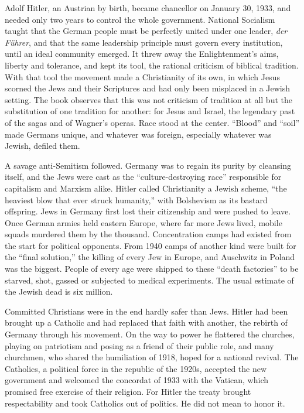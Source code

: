 Adolf Hitler, an Austrian by birth, became chancellor on January 30, 1933, and needed only two years
to control the whole government. National Socialism taught that the German people must be perfectly
united under one leader, \emph{der F\"uhrer}, and that the same leadership principle must govern
every institution, until an ideal community emerged. It threw away the Enlightenment's aims, liberty
and tolerance, and kept its tool, the rational criticism of biblical tradition. With that tool the
movement made a Christianity of its own, in which Jesus scorned the Jews and their Scriptures and had
only been misplaced in a Jewish setting. The book observes that this was not criticism of tradition
at all but the substitution of one tradition for another: for Jesus and Israel, the legendary past of
the sagas and of Wagner's operas. Race stood at the center. ``Blood'' and ``soil'' made Germans
unique, and whatever was foreign, especially whatever was Jewish, defiled them.

A savage anti-Semitism followed. Germany was to regain its purity by cleansing itself, and the Jews
were cast as the ``culture-destroying race'' responsible for capitalism and Marxism alike. Hitler
called Christianity a Jewish scheme, ``the heaviest blow that ever struck humanity,'' with Bolshevism
as its bastard offspring. Jews in Germany first lost their citizenship and were pushed to leave. Once
German armies held eastern Europe, where far more Jews lived, mobile squads murdered them by the
thousand. Concentration camps had existed from the start for political opponents. From 1940 camps of
another kind were built for the ``final solution,'' the killing of every Jew in Europe, and Auschwitz
in Poland was the biggest. People of every age were shipped to these ``death factories'' to be
starved, shot, gassed or subjected to medical experiments. The usual estimate of the Jewish dead is
six million.

Committed Christians were in the end hardly safer than Jews. Hitler had been brought up a Catholic
and had replaced that faith with another, the rebirth of Germany through his movement. On the way to
power he flattered the churches, playing on patriotism and posing as a friend of their public role,
and many churchmen, who shared the humiliation of 1918, hoped for a national revival. The Catholics,
a political force in the republic of the 1920s, accepted the new government and welcomed the
concordat of 1933 with the Vatican, which promised free exercise of their religion. For Hitler the
treaty brought respectability and took Catholics out of politics. He did not mean to honor it.

